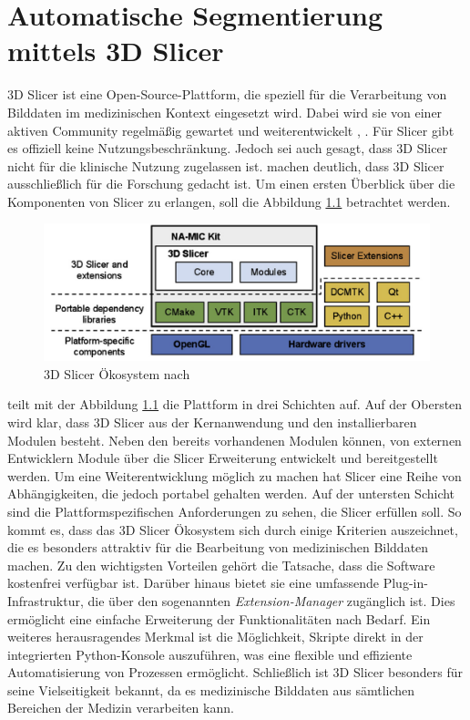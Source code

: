 \chapter{Automatische Segmentierung mittels 3D Slicer}
\label{sec:3d_slicer} 3D Slicer ist eine Open-Source-Plattform, die speziell für
die Verarbeitung von Bilddaten im medizinischen Kontext eingesetzt wird. Dabei wird
sie von einer aktiven Community regelmäßig gewartet und weiterentwickelt \citep[vgl.][]{slicer2024},
\citep[vgl.][S.~1325]{fedorov2012slicer}. Für Slicer gibt es offiziell keine Nutzungsbeschränkung.
Jedoch sei auch gesagt, dass 3D Slicer nicht für die klinische Nutzung zugelassen
ist. \citet[S.~1331]{fedorov2012slicer} machen deutlich, dass 3D Slicer
ausschließlich für die Forschung gedacht ist. Um einen ersten Überblick über die
Komponenten von Slicer zu erlangen, soll die Abbildung
\ref{fig:3d_slicer_oekosystem} betrachtet werden.

\begin{figure}[h]
	\centering
	\includegraphics[width=1\textwidth]{img/3d_slicer_overview.jpg}
	\caption{3D Slicer Ökosystem nach \citet[S.~1326]{fedorov2012slicer}}
	\label{fig:3d_slicer_oekosystem}
\end{figure}

\citet[S.~1326]{fedorov2012slicer} teilt mit der Abbildung
\ref{fig:3d_slicer_oekosystem} die Plattform in drei Schichten auf. Auf der Obersten
wird klar, dass 3D Slicer aus der Kernanwendung und den installierbaren Modulen
besteht. Neben den bereits vorhandenen Modulen können, von externen Entwicklern
Module über die Slicer Erweiterung entwickelt und bereitgestellt werden. Um eine
Weiterentwicklung möglich zu machen hat Slicer eine Reihe von Abhängigkeiten,
die jedoch portabel gehalten werden. Auf der untersten Schicht sind die Plattformspezifischen
Anforderungen zu sehen, die Slicer erfüllen soll. So kommt es, dass das 3D
Slicer Ökosystem sich durch einige Kriterien auszeichnet, die es besonders attraktiv
für die Bearbeitung von medizinischen Bilddaten machen. Zu den wichtigsten
Vorteilen gehört die Tatsache, dass die Software kostenfrei verfügbar ist.
Darüber hinaus bietet sie eine umfassende Plug-in-Infrastruktur, die über den sogenannten
\textit{Extension-Manager} zugänglich ist. Dies ermöglicht eine einfache Erweiterung
der Funktionalitäten nach Bedarf. Ein weiteres herausragendes Merkmal ist die
Möglichkeit, Skripte direkt in der integrierten Python-Konsole auszuführen, was
eine flexible und effiziente Automatisierung von Prozessen ermöglicht. Schließlich
ist 3D Slicer besonders für seine Vielseitigkeit bekannt, da es medizinische
Bilddaten aus sämtlichen Bereichen der Medizin verarbeiten kann.

